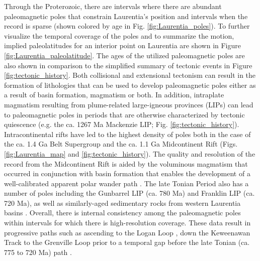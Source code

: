 \documentclass[twocolumn, switch]{article} %
\begin{document}
Through the Proterozoic, there are intervals where there are abundant paleomagnetic poles that constrain Laurentia's position and intervals when the record is sparse (shown colored by age in Fig. \ref{fig:Laurentia_poles}). To further visualize the temporal coverage of the poles and to summarize the motion, implied paleolatitudes for an interior point on Laurentia are shown in Figure \ref{fig:Laurentia_paleolatitude}. The ages of the utilized paleomagnetic poles are also shown in comparison to the simplified summary of tectonic events in Figure \ref{fig:tectonic_history}. Both collisional and extensional tectonism can result in the formation of lithologies that can be used to develop paleomagnetic poles either as a result of basin formation, magmatism or both. In addition, intraplate magmatism resulting from plume-related large-igneous provinces (LIPs) can lead to paleomagnetic poles in periods that are otherwise characterized by tectonic quiescence (e.g. the ca. 1267 Ma Mackenzie LIP; Fig. \ref{fig:tectonic_history}). Intracontinental rifts have led to the highest density of poles both in the case of the ca. 1.4 Ga Belt Supergroup and the ca. 1.1 Ga Midcontinent Rift (Figs. \ref{fig:Laurentia_map} and \ref{fig:tectonic_history}). The quality and resolution of the record from the Midcontinent Rift is aided by the voluminous magmatism that occurred in conjunction with basin formation that enables the development of a well-calibrated apparent polar wander path \citep{Swanson-Hysell2019a}. The late Tonian Period also has a number of poles including the Gunbarrel LIP (ca. 780 Ma) and Franklin LIP (ca. 720 Ma), as well as similarly-aged sedimentary rocks from western Laurentia basins \citep{Eyster2019a}. Overall, there is internal consistency among the paleomagnetic poles within intervals for which there is high-resolution coverage. These data result in progressive paths such as ascending to the Logan Loop \citep{Robertson1971a}, down the Keweenawan Track \citep{Swanson-Hysell2019a} to the Grenville Loop \citep{McWilliams1975a} prior to a temporal gap before the late Tonian (ca. 775 to 720 Ma) path \citep{Eyster2019a}.
\end{document}
